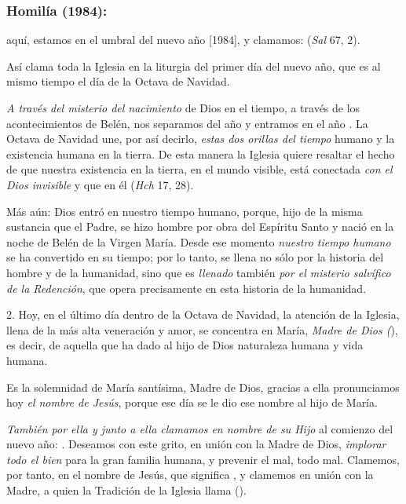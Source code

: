 \subsubsection{Homilía (1984):} 


\begin{body}
	 aquí, estamos en el umbral del nuevo año {[}1984{]}, y clamamos:  (\emph{Sal} 67, 2).
	
	Así clama toda la Iglesia en la liturgia del primer día del nuevo año, que es al mismo tiempo el día de la Octava de Navidad.
	
	\emph{A través del misterio del nacimiento} de Dios en el tiempo, a través de los acontecimientos de Belén, nos separamos del año  y entramos en el año . La Octava de Navidad une, por así decirlo, \emph{estas dos orillas del tiempo} humano y la existencia humana en la tierra. De esta manera la Iglesia quiere resaltar el hecho de que nuestra existencia en la tierra, en el mundo visible, está conectada \emph{con el Dios invisible} y que en él  (\emph{Hch} 17, 28).
	
	Más aún: Dios entró en nuestro tiempo humano, porque, hijo de la misma sustancia que el Padre, se hizo hombre por obra del Espíritu Santo y nació en la noche de Belén de la Virgen María. Desde ese momento \emph{nuestro tiempo humano} se ha convertido en su tiempo; por lo tanto, se llena no sólo por la historia del hombre y de la humanidad, sino que es \emph{llenado} también \emph{por el misterio salvífico de la 	Redención}, que opera precisamente en esta historia de la humanidad.
	
	2. Hoy, en el último día dentro de la Octava de Navidad, la atención de la Iglesia, llena de la más alta veneración y amor, se concentra en María, \emph{Madre de Dios (}), es decir, de aquella que ha dado al hijo de Dios naturaleza humana y vida humana.
	
	Es la solemnidad de María santísima, Madre de Dios, gracias a ella pronunciamos hoy \emph{el nombre de Jesús}, porque ese día se le dio ese nombre al hijo de María.
	
	\emph{También por ella y junto a ella clamamos en nombre de su Hijo} al comienzo del nuevo año: . Deseamos con este grito, en unión con la Madre de Dios, \emph{implorar todo el bien} para la gran familia humana, y prevenir el mal, todo mal. Clamemos, por tanto, en el nombre de Jesús, que significa , y clamemos en unión con la Madre, a quien la Tradición de la Iglesia llama  ().
	

\end{body}
